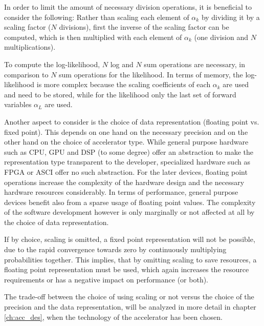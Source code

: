 \documentclass[mscthesis]{usiinfthesis}
\begin{document}
In order to limit the amount of necessary division operations, it is beneficial
to consider the following: Rather than scaling each element of $ \alpha_k $ by
dividing it by a scaling factor ($ N $ divisions), first the inverse of the
scaling factor can be computed, which is then multiplied with each element of
$ \alpha_k $ (one division and $ N $ multiplications). 

To compute the log-likelihood, $ N $ log and $ N $ sum operations are
necessary, in comparison to $ N $ sum operations for the likelihood. In terms
of memory, the log-likelihood is more complex because the scaling coefficients
of each $ \alpha_k $ are used and need to be stored, while for the likelihood
only the last set of forward variables $ \alpha_L $ are used.

Another aspect to consider is the choice of data representation (floating point
vs. fixed point). This depends on one hand on the necessary precision and on
the other hand on the choice of accelerator type.  While general purpose
hardware such as CPU, GPU and DSP (to some degree) offer an abstraction to make
the representation type transparent to the developer, specialized hardware such
as FPGA or ASCI offer no such abstraction. For the later devices, floating
point operations increase the complexity of the hardware design and the
necessary hardware resources considerably. In terms of performance, general
purpose devices benefit also from a sparse usage of floating point values. The
complexity of the software development however is only marginally or not
affected at all by the choice of data representation.

If by choice, scaling is omitted, a fixed point representation will not be
possible, due to the rapid convergence towards zero by continuously multiplying
probabilities together. This implies, that by omitting scaling to save
resources, a floating point representation must be used, which again increases
the resource requirements or has a negative impact on performance (or both).

The trade-off between the choice of using scaling or not versus the choice of
the precision and the data representation, will be analyzed in more detail in
chapter \ref{ch:acc_des}, when the technology of the accelerator has been
chosen.
\end{document}
